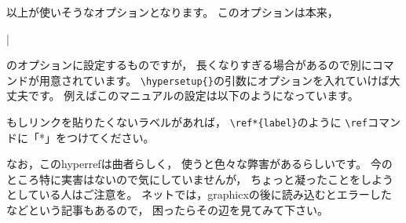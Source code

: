 以上が使いそうなオプションとなります。
このオプションは本来，
\begin{ITeX}
\usepackage{hyperref}|
\end{ITeX}
のオプションに設定するものですが，
長くなりすぎる場合があるので別にコマンドが用意されています。
\verb|\hypersetup{}|の引数にオプションを入れていけば大丈夫です。
例えばこのマニュアルの設定は以下のようになっています。

\begin{ITeX}
\end{ITeX}

もしリンクを貼りたくないラベルがあれば，
\verb|\ref*{label}|のように
\verb|\ref|コマンドに「*」をつけてください。

なお，このhyperrefは曲者らしく，
使うと色々な弊害があるらしいです。
今のところ特に実害はないので気にしていませんが，
ちょっと凝ったことをしようとしている人はご注意を。
ネットでは，graphicxの後に読み込むとエラーしたなどという記事もあるので，
困ったらその辺を見てみて下さい。

